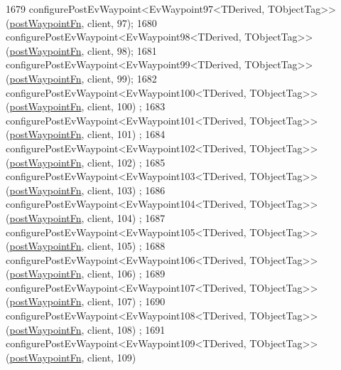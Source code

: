 \begin{DoxyCode}
1679     configurePostEvWaypoint<EvWaypoint97<TDerived, TObjectTag>>(\hyperlink{classcl__move__base__z_1_1WaypointEventDispatcher_a964a57fcce5d48ec60243230722d8dd7}{postWaypointFn}, client, 97);
1680     configurePostEvWaypoint<EvWaypoint98<TDerived, TObjectTag>>(\hyperlink{classcl__move__base__z_1_1WaypointEventDispatcher_a964a57fcce5d48ec60243230722d8dd7}{postWaypointFn}, client, 98);
1681     configurePostEvWaypoint<EvWaypoint99<TDerived, TObjectTag>>(\hyperlink{classcl__move__base__z_1_1WaypointEventDispatcher_a964a57fcce5d48ec60243230722d8dd7}{postWaypointFn}, client, 99);
1682     configurePostEvWaypoint<EvWaypoint100<TDerived, TObjectTag>>(\hyperlink{classcl__move__base__z_1_1WaypointEventDispatcher_a964a57fcce5d48ec60243230722d8dd7}{postWaypointFn}, client, 100)
      ;
1683     configurePostEvWaypoint<EvWaypoint101<TDerived, TObjectTag>>(\hyperlink{classcl__move__base__z_1_1WaypointEventDispatcher_a964a57fcce5d48ec60243230722d8dd7}{postWaypointFn}, client, 101)
      ;
1684     configurePostEvWaypoint<EvWaypoint102<TDerived, TObjectTag>>(\hyperlink{classcl__move__base__z_1_1WaypointEventDispatcher_a964a57fcce5d48ec60243230722d8dd7}{postWaypointFn}, client, 102)
      ;
1685     configurePostEvWaypoint<EvWaypoint103<TDerived, TObjectTag>>(\hyperlink{classcl__move__base__z_1_1WaypointEventDispatcher_a964a57fcce5d48ec60243230722d8dd7}{postWaypointFn}, client, 103)
      ;
1686     configurePostEvWaypoint<EvWaypoint104<TDerived, TObjectTag>>(\hyperlink{classcl__move__base__z_1_1WaypointEventDispatcher_a964a57fcce5d48ec60243230722d8dd7}{postWaypointFn}, client, 104)
      ;
1687     configurePostEvWaypoint<EvWaypoint105<TDerived, TObjectTag>>(\hyperlink{classcl__move__base__z_1_1WaypointEventDispatcher_a964a57fcce5d48ec60243230722d8dd7}{postWaypointFn}, client, 105)
      ;
1688     configurePostEvWaypoint<EvWaypoint106<TDerived, TObjectTag>>(\hyperlink{classcl__move__base__z_1_1WaypointEventDispatcher_a964a57fcce5d48ec60243230722d8dd7}{postWaypointFn}, client, 106)
      ;
1689     configurePostEvWaypoint<EvWaypoint107<TDerived, TObjectTag>>(\hyperlink{classcl__move__base__z_1_1WaypointEventDispatcher_a964a57fcce5d48ec60243230722d8dd7}{postWaypointFn}, client, 107)
      ;
1690     configurePostEvWaypoint<EvWaypoint108<TDerived, TObjectTag>>(\hyperlink{classcl__move__base__z_1_1WaypointEventDispatcher_a964a57fcce5d48ec60243230722d8dd7}{postWaypointFn}, client, 108)
      ;
1691     configurePostEvWaypoint<EvWaypoint109<TDerived, TObjectTag>>(\hyperlink{classcl__move__base__z_1_1WaypointEventDispatcher_a964a57fcce5d48ec60243230722d8dd7}{postWaypointFn}, client, 109)

\end{DoxyCode}
